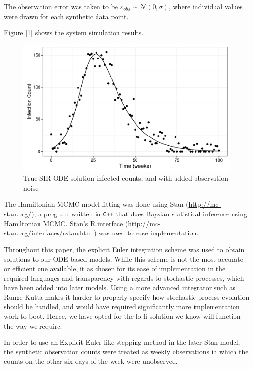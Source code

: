     The observation error was taken to be $\varepsilon_{obs} \sim \mathcal{N}(0,\sigma)$, where individual values were drawn for each synthetic data point.

    Figure [\ref{mcmcdataplot}] shows the system simulation results.

    \begin{figure}
        \centering
        \includegraphics[width=\textwidth]{./images/dataplot.pdf}
        \caption{True SIR ODE solution infected counts, and with added observation noise. \label{mcmcdataplot}}
    \end{figure}

    The Hamiltonian MCMC model fitting was done using Stan (\url{http://mc-stan.org/}), a program written in \verb|C++| that does Baysian statistical inference using Hamiltonian MCMC. Stan's R interface (\url{http://mc-stan.org/interfaces/rstan.html}) was used to ease implementation.

    Throughout this paper, the explicit Euler integration scheme was used to obtain solutions to our ODE-based models. While this scheme is not the most accurate or efficient one available, it as chosen for its ease of implementation in the required languages and transparency with regards to stochastic processes, which have been added into later models. Using a more advanced integrator such as Runge-Kutta makes it harder to properly specify how stochastic process evolution should be handled, and would have required significantly more implementation work to boot. Hence, we have opted for the lo-fi solution we know will function the way we require.

    In order to use an Explicit Euler-like stepping method in the later Stan model, the synthetic observation counts were treated as weekly observations in which the counts on the other six days of the week were unobserved.

